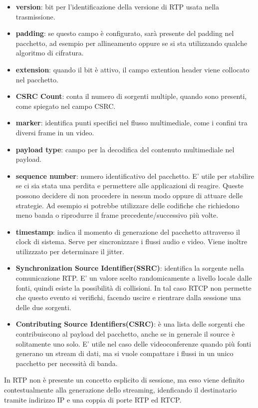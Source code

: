 \begin{itemize}
	\item \textbf{version}: bit per l'identificazione della versione di RTP usata nella trasmissione. 
	\item \textbf{padding}: se questo campo è configurato, sarà presente del padding nel pacchetto, ad esempio per allineamento oppure se si sta utilizzando qualche algoritmo di cifratura. 
	\item \textbf{extension}: quando il bit è attivo, il campo extention header viene collocato nel pacchetto. 
	\item \textbf{CSRC Count}: conta il numero di sorgenti multiple, quando sono presenti, come spiegato nel campo CSRC. 
	\item \textbf{marker}: identifica punti specifici nel flusso multimediale, come i confini tra diversi frame in un video.
	\item \textbf{payload type}: campo per la decodifica del contenuto multimediale nel payload.
	\item \textbf{sequence number}: numero identificativo del pacchetto. E' utile per stabilire se ci sia stata una perdita e permettere alle applicazioni di reagire. Queste possono decidere di non procedere in nessun modo oppure di attuare delle strategie. Ad esempio si potrebbe utilizzare delle codifiche che richiedono meno banda o riprodurre il frame precedente/successivo più volte.
	\item \textbf{timestamp}: indica il momento di generazione del pacchetto attraverso il clock di sistema. Serve per sincronizzare i flussi audio e video. Viene inoltre utilizzzato per determinare il jitter.
	\item \textbf{Synchronization Source Identifier(SSRC)}: identifica la sorgente nella comunicazione RTP. E' un valore scelto randomicamente a livello locale dalle fonti, quindi esiste la possibilità di collisioni. In tal caso RTCP non permette che questo evento si verifichi, facendo uscire e rientrare dalla sessione una delle due sorgenti.
	\item \textbf{Contributing Source Identifiers(CSRC)}: è una lista delle sorgenti che contribuiscono al payload del pacchetto, anche se in generale il source è solitamente uno solo. E' utile nel caso delle videoconferenze quando più fonti generano un stream di dati, ma si vuole compattare i flussi in un unico pacchetto per necessità di banda. 
\end{itemize}

In RTP non è presente un concetto esplicito di sessione, ma esso viene definito contestualmente alla generazione dello streaming, idenficando il destinatario tramite indirizzo IP e una coppia di porte RTP ed RTCP. %

